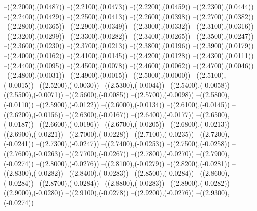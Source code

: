 {	--({\sx*(2.2000)},{\sy*(0.0487)})
	--({\sx*(2.2100)},{\sy*(0.0473)})
	--({\sx*(2.2200)},{\sy*(0.0459)})
	--({\sx*(2.2300)},{\sy*(0.0444)})
	--({\sx*(2.2400)},{\sy*(0.0429)})
	--({\sx*(2.2500)},{\sy*(0.0413)})
	--({\sx*(2.2600)},{\sy*(0.0398)})
	--({\sx*(2.2700)},{\sy*(0.0382)})
	--({\sx*(2.2800)},{\sy*(0.0365)})
	--({\sx*(2.2900)},{\sy*(0.0349)})
	--({\sx*(2.3000)},{\sy*(0.0332)})
	--({\sx*(2.3100)},{\sy*(0.0316)})
	--({\sx*(2.3200)},{\sy*(0.0299)})
	--({\sx*(2.3300)},{\sy*(0.0282)})
	--({\sx*(2.3400)},{\sy*(0.0265)})
	--({\sx*(2.3500)},{\sy*(0.0247)})
	--({\sx*(2.3600)},{\sy*(0.0230)})
	--({\sx*(2.3700)},{\sy*(0.0213)})
	--({\sx*(2.3800)},{\sy*(0.0196)})
	--({\sx*(2.3900)},{\sy*(0.0179)})
	--({\sx*(2.4000)},{\sy*(0.0162)})
	--({\sx*(2.4100)},{\sy*(0.0145)})
	--({\sx*(2.4200)},{\sy*(0.0128)})
	--({\sx*(2.4300)},{\sy*(0.0111)})
	--({\sx*(2.4400)},{\sy*(0.0095)})
	--({\sx*(2.4500)},{\sy*(0.0078)})
	--({\sx*(2.4600)},{\sy*(0.0062)})
	--({\sx*(2.4700)},{\sy*(0.0046)})
	--({\sx*(2.4800)},{\sy*(0.0031)})
	--({\sx*(2.4900)},{\sy*(0.0015)})
	--({\sx*(2.5000)},{\sy*(0.0000)})
	--({\sx*(2.5100)},{\sy*(-0.0015)})
	--({\sx*(2.5200)},{\sy*(-0.0030)})
	--({\sx*(2.5300)},{\sy*(-0.0044)})
	--({\sx*(2.5400)},{\sy*(-0.0058)})
	--({\sx*(2.5500)},{\sy*(-0.0071)})
	--({\sx*(2.5600)},{\sy*(-0.0085)})
	--({\sx*(2.5700)},{\sy*(-0.0098)})
	--({\sx*(2.5800)},{\sy*(-0.0110)})
	--({\sx*(2.5900)},{\sy*(-0.0122)})
	--({\sx*(2.6000)},{\sy*(-0.0134)})
	--({\sx*(2.6100)},{\sy*(-0.0145)})
	--({\sx*(2.6200)},{\sy*(-0.0156)})
	--({\sx*(2.6300)},{\sy*(-0.0167)})
	--({\sx*(2.6400)},{\sy*(-0.0177)})
	--({\sx*(2.6500)},{\sy*(-0.0187)})
	--({\sx*(2.6600)},{\sy*(-0.0196)})
	--({\sx*(2.6700)},{\sy*(-0.0205)})
	--({\sx*(2.6800)},{\sy*(-0.0213)})
	--({\sx*(2.6900)},{\sy*(-0.0221)})
	--({\sx*(2.7000)},{\sy*(-0.0228)})
	--({\sx*(2.7100)},{\sy*(-0.0235)})
	--({\sx*(2.7200)},{\sy*(-0.0241)})
	--({\sx*(2.7300)},{\sy*(-0.0247)})
	--({\sx*(2.7400)},{\sy*(-0.0253)})
	--({\sx*(2.7500)},{\sy*(-0.0258)})
	--({\sx*(2.7600)},{\sy*(-0.0263)})
	--({\sx*(2.7700)},{\sy*(-0.0267)})
	--({\sx*(2.7800)},{\sy*(-0.0270)})
	--({\sx*(2.7900)},{\sy*(-0.0274)})
	--({\sx*(2.8000)},{\sy*(-0.0276)})
	--({\sx*(2.8100)},{\sy*(-0.0279)})
	--({\sx*(2.8200)},{\sy*(-0.0281)})
	--({\sx*(2.8300)},{\sy*(-0.0282)})
	--({\sx*(2.8400)},{\sy*(-0.0283)})
	--({\sx*(2.8500)},{\sy*(-0.0284)})
	--({\sx*(2.8600)},{\sy*(-0.0284)})
	--({\sx*(2.8700)},{\sy*(-0.0284)})
	--({\sx*(2.8800)},{\sy*(-0.0283)})
	--({\sx*(2.8900)},{\sy*(-0.0282)})
	--({\sx*(2.9000)},{\sy*(-0.0280)})
	--({\sx*(2.9100)},{\sy*(-0.0278)})
	--({\sx*(2.9200)},{\sy*(-0.0276)})
	--({\sx*(2.9300)},{\sy*(-0.0274)})
}
